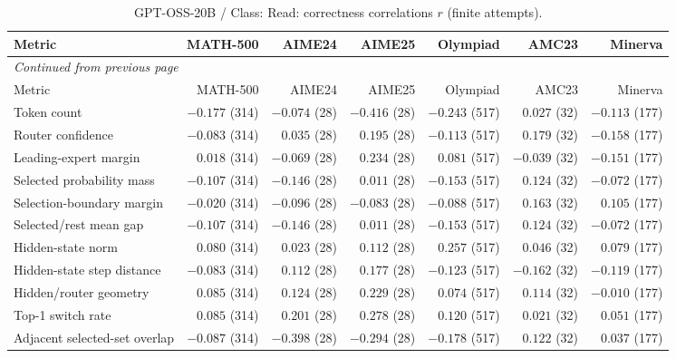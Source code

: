 \begingroup\scriptsize\setlength{\tabcolsep}{4pt}
\begin{longtable}{@{}lrrrrrr@{}}
\caption{GPT-OSS-20B / Class: Read: correctness correlations $r$ (finite attempts).}\label{tab:multi-gptoss-class-Read}\\
\toprule
Metric & MATH-500 & AIME24 & AIME25 & Olympiad & AMC23 & Minerva \\
\midrule\endfirsthead
\multicolumn{7}{l}{\textit{Continued from previous page}}\\
\toprule
Metric & MATH-500 & AIME24 & AIME25 & Olympiad & AMC23 & Minerva \\
\midrule\endhead
\bottomrule\endfoot
Token count & $-0.177$ (314) & $-0.074$ (28) & $-0.416$ (28) & $-0.243$ (517) & $0.027$ (32) & $-0.113$ (177) \\
Router confidence & $-0.083$ (314) & $0.035$ (28) & $0.195$ (28) & $-0.113$ (517) & $0.179$ (32) & $-0.158$ (177) \\
Leading-expert margin & $0.018$ (314) & $-0.069$ (28) & $0.234$ (28) & $0.081$ (517) & $-0.039$ (32) & $-0.151$ (177) \\
Selected probability mass & $-0.107$ (314) & $-0.146$ (28) & $0.011$ (28) & $-0.153$ (517) & $0.124$ (32) & $-0.072$ (177) \\
Selection-boundary margin & $-0.020$ (314) & $-0.096$ (28) & $-0.083$ (28) & $-0.088$ (517) & $0.163$ (32) & $0.105$ (177) \\
Selected/rest mean gap & $-0.107$ (314) & $-0.146$ (28) & $0.011$ (28) & $-0.153$ (517) & $0.124$ (32) & $-0.072$ (177) \\
Hidden-state norm & $0.080$ (314) & $0.023$ (28) & $0.112$ (28) & $0.257$ (517) & $0.046$ (32) & $0.079$ (177) \\
Hidden-state step distance & $-0.083$ (314) & $0.112$ (28) & $0.177$ (28) & $-0.123$ (517) & $-0.162$ (32) & $-0.119$ (177) \\
Hidden/router geometry & $0.085$ (314) & $0.124$ (28) & $0.229$ (28) & $0.074$ (517) & $0.114$ (32) & $-0.010$ (177) \\
Top-1 switch rate & $0.085$ (314) & $0.201$ (28) & $0.278$ (28) & $0.120$ (517) & $0.021$ (32) & $0.051$ (177) \\
Adjacent selected-set overlap & $-0.087$ (314) & $-0.398$ (28) & $-0.294$ (28) & $-0.178$ (517) & $0.122$ (32) & $0.037$ (177) \\
\end{longtable}\endgroup

